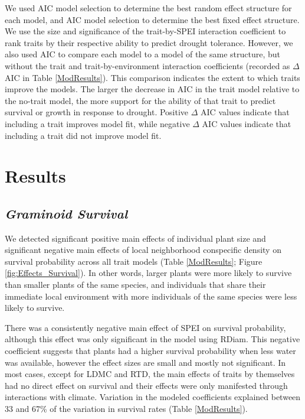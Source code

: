 \documentclass[12pt, letterpaper]{article}
\begin{document}
We used AIC model selection to determine the best random effect structure for each model, and AIC model selection to determine the best fixed effect structure. We use the size and significance of the trait-by-SPEI interaction coefficient to rank traits by their respective ability to predict drought tolerance. However, we also used AIC to compare each model to a model of the same structure, but without the trait and trait-by-environment interaction coefficients (recorded as $\Delta$ AIC in Table \ref{ModResults}). This comparison indicates the extent to which traits improve the models. The larger the decrease in AIC in the trait model relative to the no-trait model, the more support for the ability of that trait to predict survival or growth in response to drought. Positive $\Delta$ AIC values indicate that including a trait improves model fit, while negative $\Delta$ AIC values indicate that including a trait did not improve model fit.

\section{Results}
\subsection{\textit{Graminoid Survival}} We detected significant positive main effects of individual plant size and significant negative main effects of local neighborhood conspecific density on survival probability across all trait models (Table \ref{ModResults}; Figure \ref{fig:Effects_Survival}). In other words, larger plants were more likely to survive than smaller plants of the same species, and individuals that share their immediate local environment with more individuals of the same species were less likely to survive.  

There was a consistently negative main effect of SPEI on survival probability, although this effect was only significant in the model using RDiam. This negative coefficient suggests that plants had a higher survival probability when less water was available, however the effect sizes are small and mostly not significant. In most cases, except for LDMC and RTD, the main effects of traits by themselves had no direct effect on survival and their effects were only manifested through interactions with climate. Variation in the modeled coefficients explained between 33 and 67\% of the variation in survival rates (Table \ref{ModResults}). 
\end{document}
